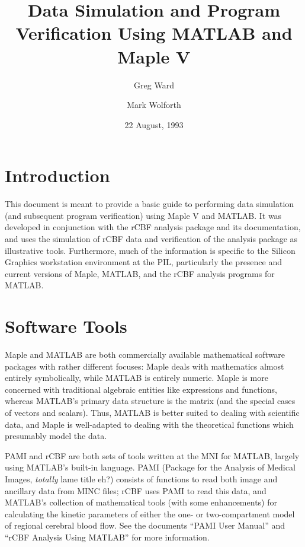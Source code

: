 
\title{Data Simulation and Program Verification Using MATLAB and Maple V}
\author{Greg Ward \and Mark Wolforth}
\date{22 August, 1993}

\def\code#1{{\tt #1}}

\def\simuldir{~greg/matlab/testing}
\newcommand{\units}[1]{\mbox{$\rm{#1}$}}
\newcommand{\funits}[2]{\mbox{$\rm\frac{#1}{#2}$}}



\maketitle

\tableofcontents

\section{Introduction}

This document is meant to provide a basic guide to performing data
simulation (and subsequent program verification) using Maple V and
MATLAB.  It was developed in conjunction with the rCBF analysis package
and its documentation, and uses the simulation of rCBF data and
verification of the analysis package as illustrative tools.
Furthermore, much of the information is specific to the Silicon Graphics
workstation environment at the PIL, particularly the presence and
current versions of Maple, MATLAB, and the rCBF analysis programs for
MATLAB.

\section{Software Tools}

Maple and MATLAB are both commercially available mathematical software
packages with rather different focuses: Maple deals with mathematics
almost entirely symbolically, while MATLAB is entirely numeric.  Maple
is more concerned with traditional algebraic entities like expressions
and functions, whereas MATLAB's primary data structure is the matrix
(and the special cases of vectors and scalars).  Thus, MATLAB is
better suited to dealing with scientific data, and Maple is well-adapted
to dealing with the theoretical functions which presumably model the
data.

PAMI and rCBF are both sets of tools written at the MNI for MATLAB,
largely using MATLAB's built-in language.  PAMI (Package for the
Analysis of Medical Images, {\em totally} lame title eh?) consists of
functions to read both image and ancillary data from MINC files;
rCBF uses PAMI to read this data, and MATLAB's collection of
mathematical tools (with some enhancements) for calculating the kinetic
parameters of either the one- or two-compartment model of regional
cerebral blood flow.  See the documents ``PAMI User Manual'' and ``rCBF
Analysis Using MATLAB'' for more information.

